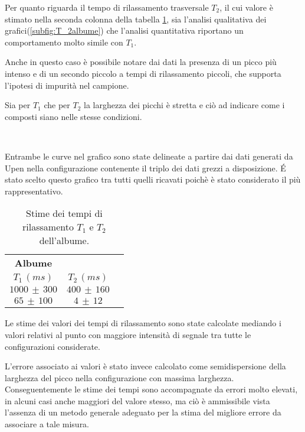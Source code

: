 Per quanto riguarda il tempo di rilassamento trasversale $T_2$, il cui valore è stimato nella seconda colonna della tabella \ref{tab:Albume}, sia l'analisi qualitativa dei grafici(\ref{subfig:T_2albume}) che l'analisi quantitativa riportano un comportamento molto simile con $T_1$.

Anche in questo caso è possibile notare dai dati la presenza di un picco più intenso e di un secondo piccolo a tempi di rilassamento piccoli, che supporta l'ipotesi di impurità nel campione.

Sia per $T_1$ che per $T_2$ la larghezza dei picchi è stretta e ciò ad indicare come i composti siano nelle stesse condizioni. 

\begin{figure}[h]
\centering
{} \quad
{} \\
\caption{}
\label{fig:T_albume}
\end{figure}

Entrambe le curve nel grafico sono state delineate a partire dai dati generati da Upen nella configurazione contenente il triplo dei dati grezzi a disposizione.
\'E stato scelto questo grafico tra tutti quelli ricavati poichè è stato considerato il più rappresentativo.

\begin{table}[h]
	\centering
	\begin{tabular}{ccc}
	\toprule
					\textbf{Albume}	\\
		$T_1\,(ms)$ 		& 		$T_2\,(ms)$ 		\\	
	\midrule
		$1000\,\pm\,300$	&		$400\,\pm\,160$		\\
		$65\,\pm\,100$		&		$4\,\pm\,12$		\\
	\bottomrule
	\end{tabular}
	\caption{Stime dei tempi di rilassamento $T_1$ e $T_2$ dell'albume.}
	\label{tab:Albume}
\end{table}

Le stime dei valori dei tempi di rilassamento sono state calcolate mediando i valori relativi al punto con maggiore intensità di segnale tra tutte le configurazioni considerate.

L'errore associato ai valori è stato invece calcolato come semidispersione della larghezza del picco nella configurazione con massima larghezza.
Conseguentemente le stime dei tempi sono accompagnate da errori molto elevati, in alcuni casi anche maggiori del valore stesso, ma ciò è ammissibile vista l'assenza di un metodo generale adeguato per la stima del migliore errore da associare a tale misura.

